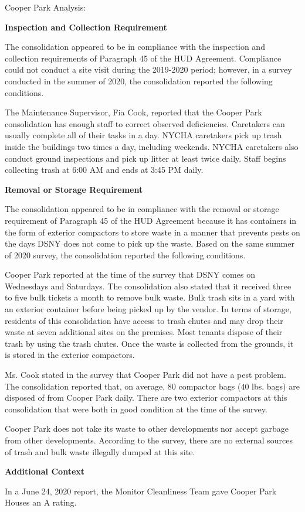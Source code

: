 Cooper Park Analysis: 

\textbf{Inspection and Collection Requirement} 

 

The consolidation appeared to be in compliance with the inspection and collection requirements of Paragraph 45 of the HUD Agreement. Compliance could not conduct a site visit during the 2019-2020 period; however, in a survey conducted in the summer of 2020, the consolidation reported the following conditions.

The Maintenance Supervisor, Fia Cook, reported that the Cooper Park consolidation has enough staff to correct observed deficiencies. Caretakers can usually complete all of their tasks in a day. NYCHA caretakers pick up trash inside the buildings two times a day, including weekends. NYCHA caretakers also conduct ground inspections and pick up litter at least twice daily. Staff begins collecting trash at 6:00 AM and ends at 3:45 PM daily.

\textbf{Removal or Storage Requirement} 

The consolidation appeared to be in compliance with the removal or storage requirement of Paragraph  45 of the HUD Agreement because it has containers in the form of exterior compactors to store waste in a manner that prevents pests on the days DSNY does not come to pick up the waste. Based on the same summer of  2020 survey, the consolidation reported the following conditions.

  

Cooper Park reported at the time of the survey that DSNY comes on Wednesdays and Saturdays. The consolidation also stated that it received three to five bulk tickets a month to remove bulk waste.  Bulk trash sits in a yard with an exterior container before being picked up by the vendor.  In terms of storage, residents of this consolidation have access to trash chutes and may drop their waste at seven additional sites on the premises. Most tenants dispose of their trash by using the trash chutes. Once the waste is collected from the grounds, it is stored in the exterior compactors.  

Ms. Cook stated in the survey that Cooper Park did not have a pest problem. The consolidation reported that, on average, 80 compactor bags (40 lbs. bags)  are disposed of from Cooper Park daily.  There are two exterior compactors at this consolidation that were both in good condition at the time of the survey. 

Cooper Park does not take its waste to other developments nor accept garbage from other developments. According to the survey, there are no external sources of trash and bulk waste illegally dumped at this site. 

\textbf{Additional Context}  

In a June 24, 2020 report, the Monitor Cleanliness Team gave Cooper Park Houses an A rating.  